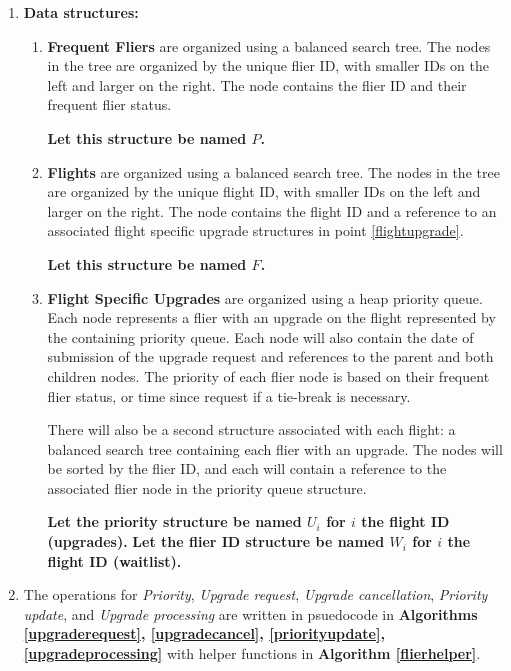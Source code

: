\documentclass{article}
\begin{document}
\begin{enumerate}[label=(\alph*)]
    \item \textbf{Data structures:}
    \begin{enumerate}[label=(\arabic*)]
        \item \textbf{Frequent Fliers} are organized using a balanced search tree.
        The nodes in the tree are organized by the unique flier ID,
        with smaller IDs on the left and larger on the right.
        The node contains the flier ID and their frequent flier status.

        \textbf{Let this structure be named $P$.}

        \item \textbf{Flights} are organized using a balanced search tree.
        The nodes in the tree are organized by the unique flight ID,
        with smaller IDs on the left and larger on the right.
        The node contains the flight ID and a reference to an associated
        flight specific upgrade structures in point \ref{flightupgrade}.

        \textbf{Let this structure be named $F$.}

        \item \textbf{Flight Specific Upgrades} \label{flightupgrade} are organized
        using a heap priority queue.
        Each node represents a flier with an upgrade on the flight represented
        by the containing priority queue.
        Each node will also contain the date of submission of the upgrade request
        and references to the parent and both children nodes.
        The priority of each flier node is based on their frequent flier status,
        or time since request if a tie-break is necessary.
        
        There will also be a second structure associated with each flight:
        a balanced search tree containing each flier with an upgrade.
        The nodes will be sorted by the flier ID, and each will contain a reference
        to the associated flier node in the priority queue structure.

        \textbf{Let the priority structure be named $U_i$ for $i$ the flight ID (upgrades).}
        \textbf{Let the flier ID structure be named $W_i$ for $i$ the flight ID (waitlist).}
    \end{enumerate}

    \item The operations for \emph{Priority}, \emph{Upgrade request},
    \emph{Upgrade cancellation}, \emph{Priority update}, and \emph{Upgrade processing}
    are written in psuedocode in \textbf{Algorithms
    \ref{upgraderequest}, \ref{upgradecancel}, \ref{priorityupdate}, \ref{upgradeprocessing}}
    with helper functions in \textbf{Algorithm \ref{flierhelper}}.


\end{enumerate}
\end{document}
